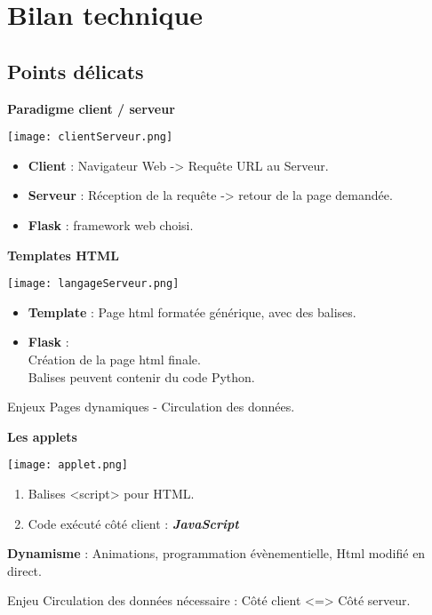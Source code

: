 	\section{Bilan technique}
		\subsection*{Points délicats}
		\begin{frame}
			\textbf{Paradigme client / serveur}\\
				\begin{center}\texttt{[image: clientServeur.png]}\end{center}
				\begin{itemize}
				\item \textbf{Client} : Navigateur Web -> Requête URL au Serveur.
				\item \textbf{Serveur} : Réception de la requête -> retour de la page demandée.
				\item \textbf{Flask} : framework web choisi.
				\end{itemize}
		\end{frame}
		
		\begin{frame}
			\textbf{Templates HTML}\\
				\begin{center}\texttt{[image: langageServeur.png]}\end{center}
				\begin{itemize}
				\item \textbf{Template} : Page html formatée générique, avec des balises.
				\item \textbf{Flask} :\\
					Création de la page html finale.\\
					Balises peuvent contenir du code Python.
				\end{itemize}
				\begin{block}{Enjeux}
				Pages dynamiques - Circulation des données.
				\end{block}
		\end{frame}
		
		\begin{frame}
			\textbf{Les applets}\\
				\begin{center}\texttt{[image: applet.png]}\end{center}
				\begin{enumerate}
				\item Balises <script> pour HTML.
				\item Code exécuté côté client : \textbf{\textit{JavaScript}}
				\end{enumerate}
				
				\textbf{Dynamisme} : Animations, programmation évènementielle, Html modifié en direct.
				
				\begin{block}{Enjeu}
				Circulation des données nécessaire : Côté client <=> Côté serveur.
				\end{block}
		\end{frame}
		
